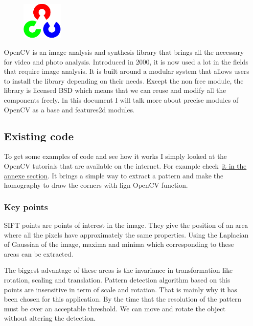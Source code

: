 		\begin{figure}
	\vspace{-7mm}
	\includegraphics[width=2cm]{images_not_compressed/opencv_logo.png}
	\end{figure}
	\par OpenCV is an image analysis and synthesis library that brings all the necessary for video and photo analysis. Introduced in 2000, it is now used a lot in the fields that require image analysis.
 It is built around a modular system that allows users to install the library depending on their needs.
 Except the non free module, the library is licensed BSD which means that we can reuse and modify all the components freely.
 In this document I will talk more about precise modules of OpenCV as a base and features2d modules.
	
	\subsection{Existing code}
	
	\par To get some examples of code and see how it works I simply looked at the OpenCV tutorials that are available on the internet. For example check~\hyperlink{opencv}{it in the annexe section}. It brings a simple way to extract a pattern and make the homography to draw the corners with lign OpenCV function.
	
	\subsubsection{Key points}
	\par SIFT points are points of interest in the image. They give the position of an area where all the pixels have approximately the same properties. Using the Laplacian of Gaussian of the image, maxima and minima which corresponding to these areas can be extracted.
	\par The biggest advantage of these areas is the invariance in transformation like rotation, scaling and translation. Pattern detection algorithm based on this points are insensitive in term of scale and rotation. That is mainly why it has been chosen for this application. By the time that the resolution of the pattern must be over an acceptable threshold. We can move and rotate the object without altering the detection.
	
